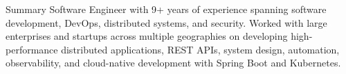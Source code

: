 \begin{rSection}{Summary}
    Software Engineer with 9+ years of experience spanning software development, DevOps, distributed systems, and security. 
    Worked with large enterprises 
    and startups across multiple geographies on developing high-performance distributed applications, REST APIs, system design, automation, observability, and cloud-native development with Spring Boot and Kubernetes.
\end{rSection}